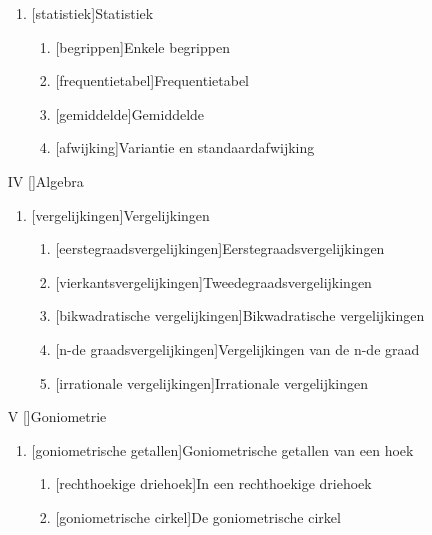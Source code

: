 \documentclass{article}
\begin{document}
\begin{itemize}
\begin{enumerate}
\item {}[statistiek]{Statistiek}
\begin{enumerate}%
\item {}[begrippen]{Enkele begrippen}
\item {}[frequentietabel]{Frequentietabel}
\item {}[gemiddelde]{Gemiddelde}
\item {}[afwijking]{Variantie en standaardafwijking}
\end{enumerate}%
\end{enumerate}%
\item[IV] []{Algebra}
\begin{enumerate}%
\item {}[vergelijkingen]{Vergelijkingen}
\begin{enumerate}%
\item {}[eerstegraadsvergelijkingen]{Eerstegraadsvergelijkingen}
\item {}[vierkantsvergelijkingen]{Tweedegraadsvergelijkingen}
\item {}[bikwadratische vergelijkingen]{Bikwadratische vergelijkingen}
\item {}[n-de graadsvergelijkingen]{Vergelijkingen van de n-de graad} 
\item {}[irrationale vergelijkingen]{Irrationale vergelijkingen}
\end{enumerate}%
\end{enumerate}%
\item[V] []{Goniometrie}
\begin{enumerate}%
\item {}[goniometrische getallen]{Goniometrische getallen van een hoek}
\begin{enumerate}%
\item {}[rechthoekige driehoek]{In een rechthoekige driehoek}
\item {}[goniometrische cirkel]{De goniometrische cirkel}

\end{enumerate}
\end{enumerate}
\end{itemize}
\end{document}
